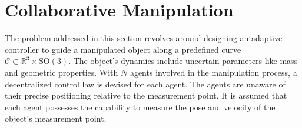 \section{Collaborative Manipulation}

The problem addressed in this section revolves around designing an adaptive controller to guide a manipulated object along a predefined curve $\mathcal{C} \subset \mathbb{R}^3\times \text{SO}(3)$. The object's dynamics include uncertain parameters like mass and geometric properties. With $N$ agents involved in the manipulation process, a decentralized control law is devised for each agent. The agents are unaware of their precise positioning relative to the measurement point. It is assumed that each agent possesses the capability to measure the pose and velocity of the object's measurement point.

